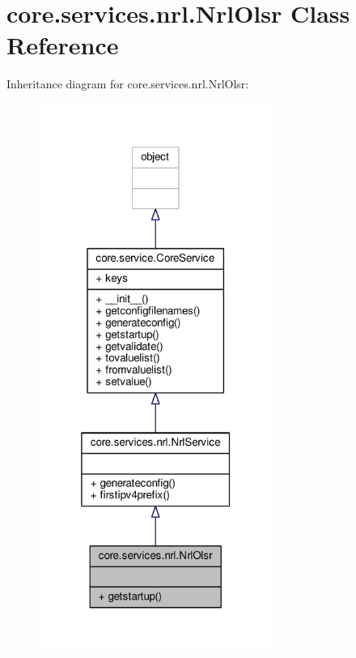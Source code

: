 \hypertarget{classcore_1_1services_1_1nrl_1_1_nrl_olsr}{\section{core.\+services.\+nrl.\+Nrl\+Olsr Class Reference}
\label{classcore_1_1services_1_1nrl_1_1_nrl_olsr}
}


Inheritance diagram for core.\+services.\+nrl.\+Nrl\+Olsr\+:
\nopagebreak
\begin{figure}[H]
\begin{center}
\leavevmode
\includegraphics[width=217pt]{classcore_1_1services_1_1nrl_1_1_nrl_olsr__inherit__graph}
\end{center}
\end{figure}



